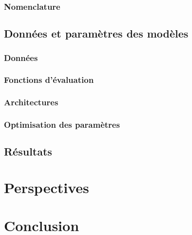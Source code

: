 \documentclass{report}
\begin{document}
		\subsection{Nomenclature}
			
			
	\section{Données et paramètres des modèles}
		\subsection{Données}
			
		\subsection{Fonctions d'évaluation}
				
		\subsection{Architectures}
			
		\subsection{Optimisation des paramètres}
			
		
	\section{Résultats}
		


\newpage\null\thispagestyle{empty}\newpage


\chapter{Perspectives}
	

\chapter*{Conclusion}
	

\newpage\null\thispagestyle{empty}\newpage





\newpage\null\thispagestyle{empty}\newpage

\addappheadtotoc
\appendixpage



\appendix




\end{document}
